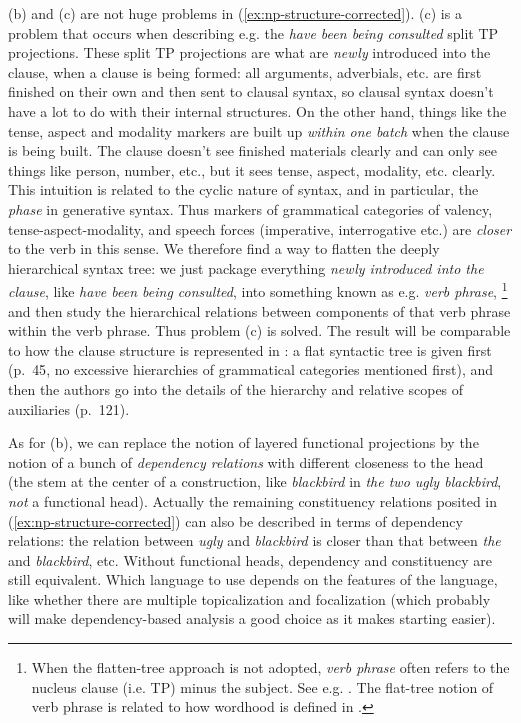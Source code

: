 \documentclass[a4paper, oneside, scheme=plain, 12pt]{article}
\newcommand*{\citepage}[1]{p.~{#1}}
\newcommand*{\term}[1]{\emph{#1}}
\newcommand{\form}[1]{\emph{#1}}
\begin{document}
(b) and (c) are not huge problems in (\ref{ex:np-structure-corrected}).
(c) is a problem that occurs when describing e.g. the \form{have been being consulted} split TP projections.
These split TP projections are what are \emph{newly} introduced into the clause,
when a clause is being formed:
all arguments, adverbials, etc. are first finished on their own 
and then sent to clausal syntax,
so clausal syntax doesn't have a lot to do with their internal structures.
On the other hand, things like the tense, aspect and modality markers are built up \emph{within one batch} when the clause is being built.
The clause doesn't see finished materials clearly and can only see things like person, number, etc.,
but it sees tense, aspect, modality, etc. clearly.
This intuition is related to the cyclic nature of syntax, and in particular, the \emph{phase} in generative syntax.
Thus markers of grammatical categories of valency, tense-aspect-modality, and speech forces (imperative, interrogative etc.)
are \emph{closer} to the verb in this sense.
We therefore find a way to flatten the deeply hierarchical syntax tree:
we just package everything \emph{newly introduced into the clause},
like \form{have been being consulted},
into something known as e.g. \term{verb phrase},%
\footnote{
    When the flatten-tree approach is not adopted,
    \term{verb phrase} often refers to the nucleus clause (i.e. TP) minus the subject.
    See e.g. \citet{cgel}.
    The flat-tree notion of verb phrase is related to how wordhood is defined in .
}
and then study the hierarchical relations between components of that verb phrase
within the verb phrase.
Thus problem (c) is solved.
The result will be comparable to how the clause structure is represented in \citet{quirk2010comprehensive}:
a flat syntactic tree is given first (\citepage{45}, no excessive hierarchies of grammatical categories mentioned first),
and then the authors go into the details of the hierarchy and relative scopes of auxiliaries
(\citepage{121}).

As for (b), we can replace the notion of layered functional projections
by the notion of a bunch of \emph{dependency relations} with different closeness to the head
(the stem at the center of a construction, like \form{blackbird} in \form{the two ugly blackbird}, \emph{not} a functional head).
Actually the remaining constituency relations posited in (\ref{ex:np-structure-corrected})
can also be described in terms of dependency relations:
the relation between \form{ugly} and \form{blackbird} is closer than
that between \form{the} and \form{blackbird}, etc.
Without functional heads, dependency and constituency are still equivalent.
Which language to use depends on the features of the language,
like whether there are multiple topicalization and focalization
(which probably will make dependency-based analysis a good choice
as it makes starting easier).
\end{document}
